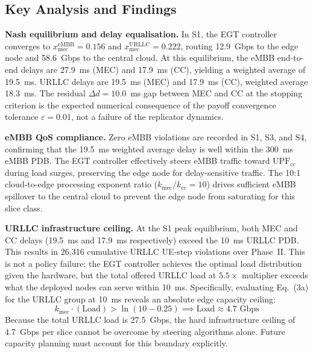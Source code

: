 \documentclass[conference]{IEEEtran}
\begin{document}
\subsection{Key Analysis and Findings}
\label{sec:key_findings}

\textbf{Nash equilibrium and delay equalisation.}
In S1, the EGT controller converges to
$x_\text{mec}^\text{eMBB} = 0.156$ and
$x_\text{mec}^\text{URLLC} = 0.222$, routing 12.9~Gbps to the
edge node and 58.6~Gbps to the central cloud. At this equilibrium,
the eMBB end-to-end delays are 27.9~ms (MEC) and 17.9~ms (CC),
yielding a weighted average of 19.5~ms. URLLC delays are 19.5~ms
(MEC) and 17.9~ms (CC), weighted average 18.3~ms. The residual
$\Delta d = 10.0$~ms gap between MEC and CC at the stopping
criterion is the expected numerical consequence of the payoff
convergence tolerance $\varepsilon = 0.01$, not a failure of
the replicator dynamics.

\textbf{eMBB QoS compliance.}
Zero eMBB violations are recorded in S1, S3, and S4, confirming
that the 19.5~ms weighted average delay is well within the
300~ms eMBB PDB. The EGT controller effectively steers eMBB
traffic toward $\text{UPF}_\text{cc}$ during load surges,
preserving the edge node for delay-sensitive traffic. The 10:1
cloud-to-edge processing exponent ratio ($k_\text{mec}/k_\text{cc}
= 10$) drives sufficient eMBB spillover to the central cloud to
prevent the edge node from saturating for this slice class.

\textbf{URLLC infrastructure ceiling.}
At the S1 peak equilibrium, both MEC and CC delays
(19.5~ms and 17.9~ms respectively) exceed the
10~ms URLLC PDB. This results in 26,316 cumulative
URLLC UE-step violations over Phase~II.
This is not a policy failure: the EGT controller achieves
the optimal load distribution given the hardware, but the
total offered URLLC load at $5.5\times$ multiplier
exceeds what the deployed nodes can serve within 10~ms.
Specifically, evaluating Eq.~(3a) for the URLLC group at 10~ms reveals an absolute edge capacity ceiling:
\begin{equation*}
  k_\text{mec} \cdot (\text{Load}) > \ln(10 - 0.25) \implies \text{Load} \approx 4.7 \text{ Gbps}
\end{equation*}
Because the total URLLC load is 27.5~Gbps, the hard infrastructure ceiling of 4.7~Gbps per slice cannot be overcome by steering algorithms alone.
Future capacity planning must account for this boundary explicitly.
\end{document}
